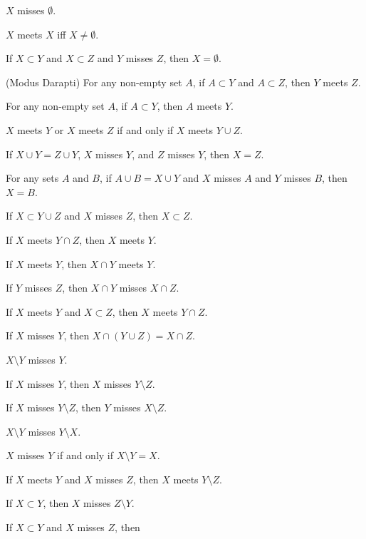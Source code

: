 \documentclass{article}
\begin{document}
\begin{thm}
\item\label{xboole1:65} $X$ misses $\emptyset$.
\item\label{xboole1:66} $X$ meets $X$ iff $X\neq\emptyset$.
\item\label{xboole1:67} If $X\subset Y$ and $X\subset Z$ and $Y$ misses $Z$,
  then $X=\emptyset$.
\item\label{xboole1:68} (Modus Darapti) For any non-empty set $A$,
  if $A\subset Y$ and $A\subset Z$, then $Y$ meets $Z$.
\item\label{xboole1:69} For any non-empty set $A$, if $A\subset Y$, then
  $A$ meets $Y$.
\item\label{xboole1:70} $X$ meets $Y$ or $X$ meets $Z$ if and only if
  $X$ meets $Y\cup Z$.
\item\label{xboole1:71} If $X\cup Y=Z\cup Y$, $X$ misses $Y$, and $Z$
  misses $Y$, then $X=Z$.
\item\label{xboole1:72} For any sets $A$ and $B$, if $A\cup B=X\cup Y$
  and $X$ misses $A$ and $Y$ misses $B$, then $X=B$.
\item\label{xboole1:73} If $X\subset Y\cup Z$ and $X$ misses $Z$, then
  $X\subset Z$.
\item\label{xboole1:74} If $X$ meets $Y\cap Z$, then $X$ meets $Y$.
\item\label{xboole1:75} If $X$ meets $Y$, then $X\cap Y$ meets $Y$.
\item\label{xboole1:76} If $Y$ misses $Z$, then $X\cap Y$ misses $X\cap Z$.
\item\label{xboole1:77} If $X$ meets $Y$ and $X\subset Z$, then $X$
  meets $Y\cap Z$.
\item\label{xboole1:78} If $X$ misses $Y$, then $X\cap(Y\cup Z)=X\cap Z$.
\item\label{xboole1:79} $X\setminus Y$ misses $Y$.
\item\label{xboole1:80} If $X$ misses $Y$, then $X$ misses $Y\setminus Z$.
\item\label{xboole1:81} If $X$ misses $Y\setminus Z$, then $Y$ misses $X\setminus Z$.
\item\label{xboole1:82} $X\setminus Y$ misses $Y\setminus X$.
\item\label{xboole1:83} $X$ misses $Y$ if and only if $X\setminus Y=X$.
\item\label{xboole1:84} If $X$ meets $Y$ and $X$ misses $Z$, then $X$
  meets $Y\setminus Z$.
\item\label{xboole1:85} If $X\subset Y$, then $X$ misses $Z\setminus Y$.
\item\label{xboole1:86} If $X\subset Y$ and $X$ misses $Z$, then

\end{thm}
\end{document}

